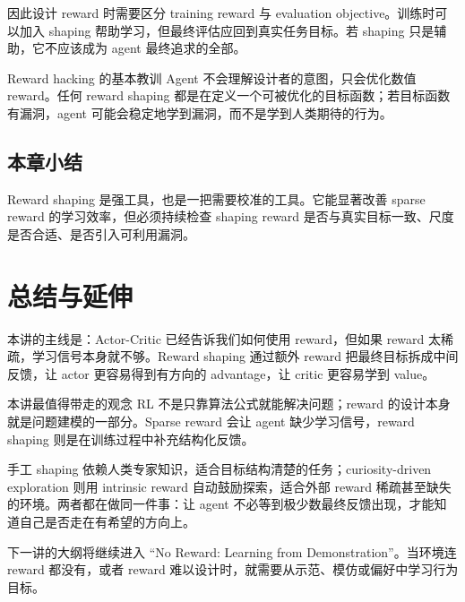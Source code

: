 \documentclass[a4paper]{article}
\begin{document}
因此设计 reward 时需要区分 training reward 与 evaluation objective。训练时可以加入 shaping 帮助学习，但最终评估应回到真实任务目标。若 shaping 只是辅助，它不应该成为 agent 最终追求的全部。

\begin{warningbox}{Reward hacking 的基本教训}
    Agent 不会理解设计者的意图，只会优化数值 reward。任何 reward shaping 都是在定义一个可被优化的目标函数；若目标函数有漏洞，agent 可能会稳定地学到漏洞，而不是学到人类期待的行为。
\end{warningbox}

\subsection{本章小结}

Reward shaping 是强工具，也是一把需要校准的工具。它能显著改善 sparse reward 的学习效率，但必须持续检查 shaping reward 是否与真实目标一致、尺度是否合适、是否引入可利用漏洞。

\section{总结与延伸}

本讲的主线是：Actor-Critic 已经告诉我们如何使用 reward，但如果 reward 太稀疏，学习信号本身就不够。Reward shaping 通过额外 reward 把最终目标拆成中间反馈，让 actor 更容易得到有方向的 advantage，让 critic 更容易学到 value。

\begin{importantbox}{本讲最值得带走的观念}
    RL 不是只靠算法公式就能解决问题；reward 的设计本身就是问题建模的一部分。Sparse reward 会让 agent 缺少学习信号，reward shaping 则是在训练过程中补充结构化反馈。
\end{importantbox}

手工 shaping 依赖人类专家知识，适合目标结构清楚的任务；curiosity-driven exploration 则用 intrinsic reward 自动鼓励探索，适合外部 reward 稀疏甚至缺失的环境。两者都在做同一件事：让 agent 不必等到极少数最终反馈出现，才能知道自己是否走在有希望的方向上。

下一讲的大纲将继续进入 ``No Reward: Learning from Demonstration''。当环境连 reward 都没有，或者 reward 难以设计时，就需要从示范、模仿或偏好中学习行为目标。
\end{document}
